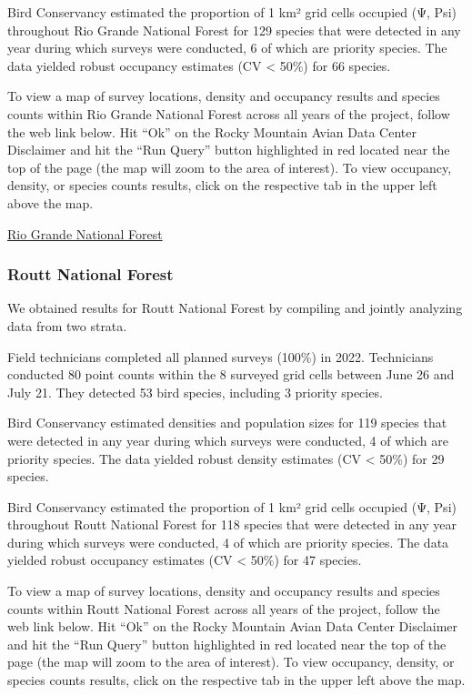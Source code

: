 \documentclass[
  letterpaper,
  DIV=11,
  numbers=noendperiod,
  oneside]{scrreprt}
\begin{document}
Bird Conservancy estimated the proportion of 1 km² grid cells occupied
(Ψ, Psi) throughout Rio Grande National Forest for 129 species that were
detected in any year during which surveys were conducted, 6 of which are
priority species. The data yielded robust occupancy estimates (CV
\textless{} 50\%) for 66 species.

To view a map of survey locations, density and occupancy results and
species counts within Rio Grande National Forest across all years of the
project, follow the web link below. Hit ``Ok'' on the Rocky Mountain
Avian Data Center Disclaimer and hit the ``Run Query'' button
highlighted in red located near the top of the page (the map will zoom
to the area of interest). To view occupancy, density, or species counts
results, click on the respective tab in the upper left above the map.

\href{http://www.rmbo.org/new_site/adc/QueryWindow.aspx\#N4IgzgrgDgpgTmALnAhoiBbEAuABCAJQEsB7XAcVQDsATGXAOTVKpQBtcAxEuGJEAL5A}{Rio
Grande National Forest}

\hypertarget{routt-national-forest}{%
\subsubsection{Routt National Forest}\label{routt-national-forest}}

We obtained results for Routt National Forest by compiling and jointly
analyzing data from two strata.

Field technicians completed all planned surveys (100\%) in 2022.
Technicians conducted 80 point counts within the 8 surveyed grid cells
between June 26 and July 21. They detected 53 bird species, including 3
priority species.

Bird Conservancy estimated densities and population sizes for 119
species that were detected in any year during which surveys were
conducted, 4 of which are priority species. The data yielded robust
density estimates (CV \textless{} 50\%) for 29 species.

Bird Conservancy estimated the proportion of 1 km² grid cells occupied
(Ψ, Psi) throughout Routt National Forest for 118 species that were
detected in any year during which surveys were conducted, 4 of which are
priority species. The data yielded robust occupancy estimates (CV
\textless{} 50\%) for 47 species.

To view a map of survey locations, density and occupancy results and
species counts within Routt National Forest across all years of the
project, follow the web link below. Hit ``Ok'' on the Rocky Mountain
Avian Data Center Disclaimer and hit the ``Run Query'' button
highlighted in red located near the top of the page (the map will zoom
to the area of interest). To view occupancy, density, or species counts
results, click on the respective tab in the upper left above the map.
\end{document}
